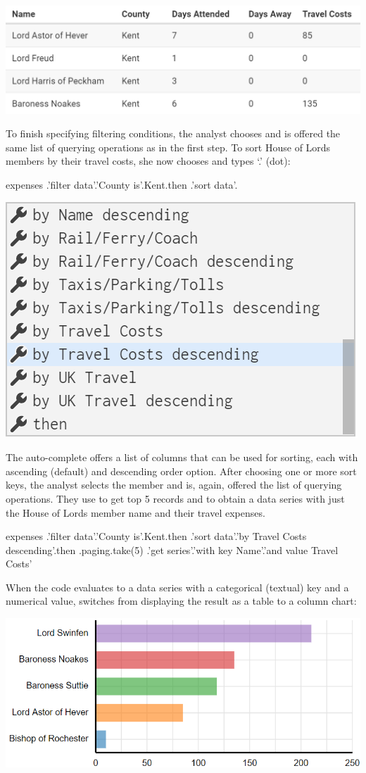 \documentclass[manuscript,review,anonymous]{acmart}
\begin{document}
\includegraphics[width=1\columnwidth]{figures/lords3}

To finish specifying filtering conditions, the analyst chooses  and is offered the
same list of querying operations as in the first step. To sort House of Lords members by their
travel costs, she now chooses  and types `.' (dot):

\begin{thegamma}
expenses
  .'filter data'.'County is'.Kent.then
  .'sort data'.
\end{thegamma}
\qquad\includegraphics[width=0.5\columnwidth]{figures/lords4}

The auto-complete offers a list of columns that can be used for sorting, each with ascending
(default) and descending order option. After choosing one or more sort keys, the analyst selects
the  member and is, again, offered the list of querying operations. They use
 to get top 5 records and  to obtain a data series with just
the House of Lords member name and their travel expenses.

\begin{thegamma}
expenses
  .'filter data'.'County is'.Kent.then
  .'sort data'.'by Travel Costs descending'.then
  .paging.take(5)
  .'get series'.'with key Name'.'and value Travel Costs'
\end{thegamma}

When the code evaluates to a data series with a categorical (textual) key and a numerical value,
\tg switches from displaying the result as a table to a column chart:

\includegraphics[width=1\columnwidth]{figures/lords5}
\vspace{-1.5em}
\end{document}
